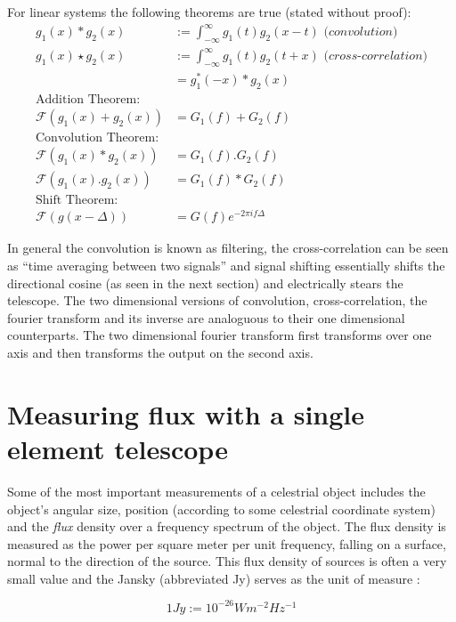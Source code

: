 \documentclass[a4paper,10pt]{report}
\begin{document}
For linear systems the following theorems are true (stated without proof):
\begin{equation*}
  \begin{split}
    g_1(x)*g_2(x) &:= \int_{-\infty}^{\infty}g_1(t)g_2(x-t)\textit{ (convolution)}\\
    g_1(x)\star g_2(x) &:= \int_{-\infty}^{\infty}g_1(t)g_2(t+x)\textit{ (cross-correlation)}\\
    &=g_1^*(-x)*g_2(x)\\
    \text{Addition Theorem:}\\
    \mathcal{F}(g_1(x)+g_2(x)) &= G_1(f)+G_2(f)\\
    \text{Convolution Theorem:}\\
    \mathcal{F}(g_1(x)*g_2(x)) &=G_1(f).G_2(f)\\
    \mathcal{F}(g_1(x).g_2(x)) &=G_1(f)*G_2(f)\\
    \text{Shift Theorem:}\\
    \mathcal{F}(g(x-\Delta))&=G(f)e^{-2\pi if\Delta}
  \end{split}
\end{equation*}

In general the convolution is known as filtering, the cross-correlation can be seen as ``time averaging between two signals'' and signal shifting essentially shifts the directional cosine (as seen in the next section) and electrically
stears the telescope. The two dimensional versions of convolution, cross-correlation, the fourier transform and its inverse are analoguous to their one dimensional counterparts. The two dimensional fourier transform first transforms
over one axis and then transforms the output on the second axis.
\section{Measuring flux with a single element telescope}
Some of the most important measurements of a celestrial object includes the object's angular size, position (according to some celestrial coordinate system) and the \textit{flux} density over a 
frequency spectrum of the object. The flux density is measured as the power per square meter per unit frequency, falling on a surface, normal to the direction of the source. This flux 
density of sources is often a very small value and the Jansky (abbreviated Jy) serves as the unit of measure \cite{christiansenradiotelescopes,wilson2009tools}:

\begin{equation*}
 1 Jy := 10^{-26}Wm^{-2}Hz^{-1}
\end{equation*}
\end{document}
